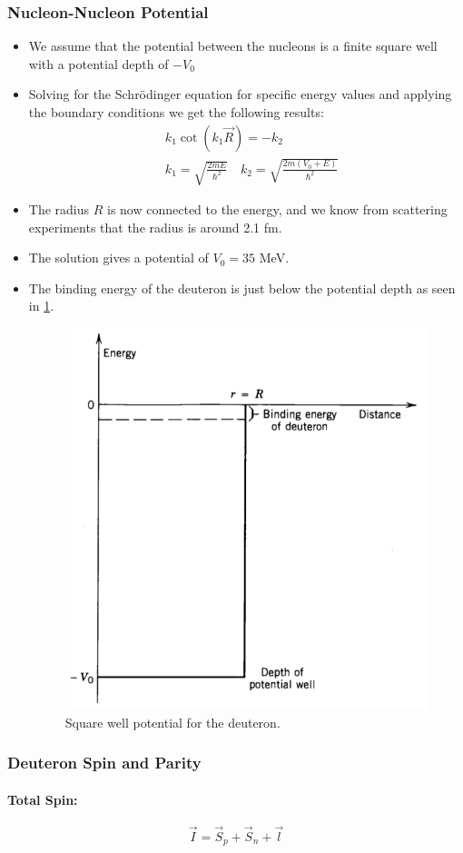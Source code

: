 \subsubsection{Nucleon-Nucleon Potential}
\begin{itemize}
    \item We assume that the potential between the nucleons is a finite square well with a potential depth of $-V_0$
    \item Solving for the Schrödinger equation for specific energy values and applying the boundary conditions we get the following results:
    \begin{align}
    &k_1 \cot \left(k_1 \vec{R}\right) = -k_2 \\
    &k_1 = \sqrt{\frac{2mE}{\hbar^2}} \quad k_2 = \sqrt{\frac{2m\left(V_0 + E\right)}{\hbar^2}}
    \end{align}
    \item The radius $R$ is now connected to the energy, and we know from scattering experiments that the radius is around 2.1 fm.
    \item The solution gives a potential of $V_0 = 35$ MeV. 
    \item The binding energy of the deuteron is just below the potential depth as seen in \cref{fig: deuteron_potential}.
    \begin{figure}[h!]
    \centering
    \includegraphics[width = .5\textwidth]{deuteron_potential.png}
    \caption{Square well potential for the deuteron. }
    \label{fig: deuteron_potential}
    \end{figure}
\end{itemize}

\subsubsection{Deuteron Spin and Parity}
\paragraph{Total Spin:}
\begin{equation}
  \vec{I} = \vec{S}_p + \vec{S}_n + \vec{l}
\end{equation}
